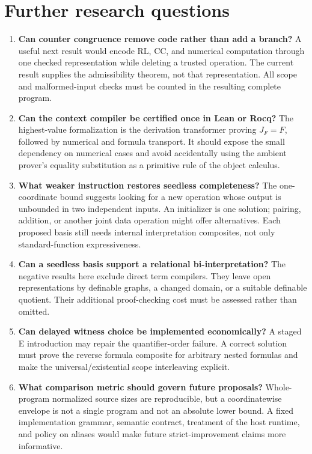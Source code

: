 \documentclass[11pt,letterpaper]{article}
\theoremstyle{definition}\newtheorem{definition}[theorem]{Definition}
\theoremstyle{remark}\newtheorem{remark}[theorem]{Remark}
\begin{document}
\section{Further research questions}
\label{sec:further}

\begin{enumerate}
\item \textbf{Can counter congruence remove code rather than add a branch?}
  A useful next result would encode RL, CC, and numerical computation
  through one checked representation while deleting a trusted
  operation. The current result supplies the admissibility theorem, not
  that representation. All scope and malformed-input checks must be
  counted in the resulting complete program.
\item \textbf{Can the context compiler be certified once in Lean or Rocq?}
  The highest-value formalization is the derivation transformer proving
  $J_F=F$, followed by numerical and formula transport. It should expose
  the small dependency on numerical cases and avoid accidentally using
  the ambient prover's equality substitution as a primitive rule of
  the object calculus.
\item \textbf{What weaker instruction restores seedless completeness?}
  The one-coordinate bound suggests looking for a new operation whose
  output is unbounded in two independent inputs. An initializer is one
  solution; pairing, addition, or another joint data operation might
  offer alternatives. Each proposed basis still needs internal
  interpretation composites, not only standard-function expressiveness.
\item \textbf{Can a seedless basis support a relational bi-interpretation?}
  The negative results here exclude direct term compilers. They leave
  open representations by definable graphs, a changed domain, or a
  suitable definable quotient. Their additional proof-checking cost
  must be assessed rather than omitted.
\item \textbf{Can delayed witness choice be implemented economically?}
  A staged E introduction may repair the quantifier-order failure.
  A correct solution must prove the reverse formula composite for
  arbitrary nested formulas and make the universal/existential scope
  interleaving explicit.
\item \textbf{What comparison metric should govern future proposals?}
  Whole-program normalized source sizes are reproducible, but a
  coordinatewise envelope is not a single program and not an absolute
  lower bound. A fixed implementation grammar, semantic contract,
  treatment of the host runtime, and policy on aliases would make
  future strict-improvement claims more informative.
\end{enumerate}
\end{document}
